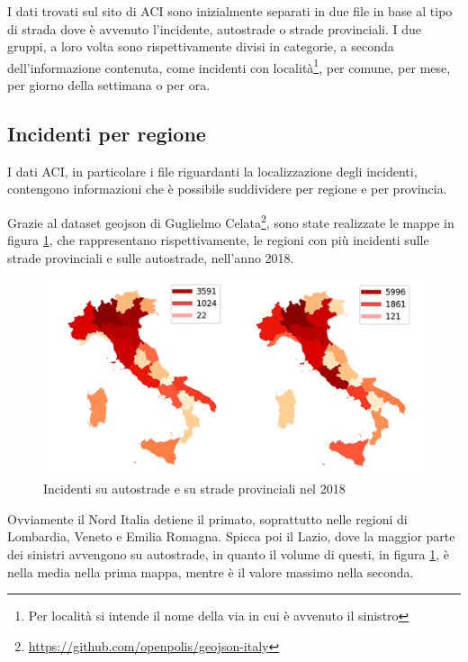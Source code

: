 \documentclass[a4paper,12pt]{report}
\begin{document}
I dati trovati sul sito di ACI sono inizialmente separati in due file in 
base al tipo di strada dove è avvenuto l'incidente, autostrade o strade provinciali. 
I due gruppi, a loro volta sono rispettivamente divisi in categorie, a seconda 
dell'informazione contenuta, come incidenti con 
località\footnote{Per località si intende il nome della via in cui è avvenuto il sinistro}, 
per comune, per mese, per giorno della settimana o per ora. 

\subsection{Incidenti per regione}

I dati ACI, in particolare i file riguardanti la 
localizzazione degli incidenti, contengono informazioni che è  
possibile suddividere per regione e per provincia. 

Grazie al dataset geojson di Guglielmo 
Celata\footnote{\url{https://github.com/openpolis/geojson-italy}}, 
sono state realizzate le mappe in figura \ref{fig:incidenti-per-regione}, 
che rappresentano rispettivamente, le regioni con più incidenti 
sulle strade provinciali e sulle autostrade, nell'anno 2018. 

\begin{figure}
    \includegraphics[width=\linewidth]{img_unite/incidenti_autostrade_provinciali.png}
    \caption{Incidenti su autostrade e su strade provinciali nel 2018}
    \label{fig:incidenti-per-regione}
\end{figure}

Ovviamente il Nord Italia detiene il primato, 
soprattutto nelle regioni di Lombardia, Veneto e Emilia Romagna. 
Spicca poi il Lazio, dove la maggior parte dei sinistri avvengono su autostrade, 
in quanto il volume di questi, in figura \ref{fig:incidenti-per-regione}, 
è nella media nella prima mappa, mentre è il valore massimo nella seconda. 
\end{document}
